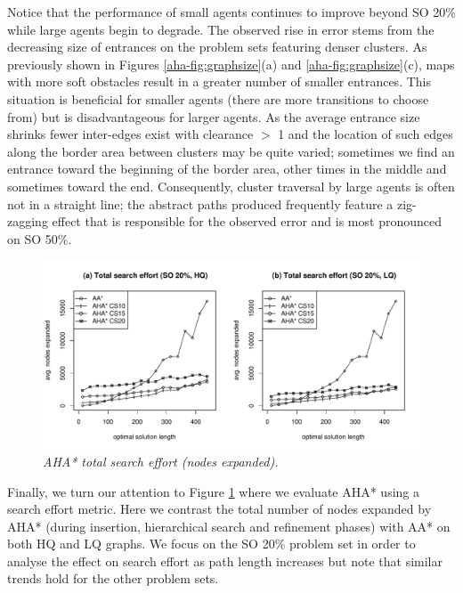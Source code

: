 Notice that the performance of small agents continues to improve beyond SO 20\% while large agents begin to degrade.
The observed rise in error stems from the decreasing size of entrances on the problem sets featuring denser clusters. 
As previously shown in Figures \ref{aha-fig:graphsize}(a) and \ref{aha-fig:graphsize}(c), maps with more soft obstacles result in a greater number of smaller entrances. 
This situation is beneficial for smaller agents (there are more transitions to choose from) but is disadvantageous for larger agents.
As the average entrance size shrinks fewer inter-edges exist with clearance $>$ 1 and the location of such edges along the border area between clusters may be quite varied; sometimes we find an entrance toward the beginning of the border area, other times in the middle and sometimes toward the end.
Consequently, cluster traversal by large agents is often not in a straight line; the abstract paths produced frequently feature a zig-zagging effect that is responsible for the observed error and is most pronounced on SO 50\%.
\begin{figure}[htbp]
	\vspace{-12pt}
	\caption{\small{\emph{AHA* total search effort (nodes expanded).}}}
	\begin{center}
		       \includegraphics[scale=0.35, trim = 20mm 17mm 20mm 5mm]{diagrams/searcheffort.pdf}
	\end{center}
	\label{aha-fig:searcheffort}
	\vspace{-5pt}
\end{figure}
%
\par \indent
Finally, we turn our attention to Figure \ref{aha-fig:searcheffort} where we evaluate AHA* using a search effort metric.
Here we contrast the total number of nodes expanded by AHA* (during insertion, hierarchical search and refinement phases) with AA* on both HQ and LQ graphs.
We focus on the SO 20\% problem set in order to analyse the effect on search effort as path length increases but note that similar trends hold for the other problem sets.
